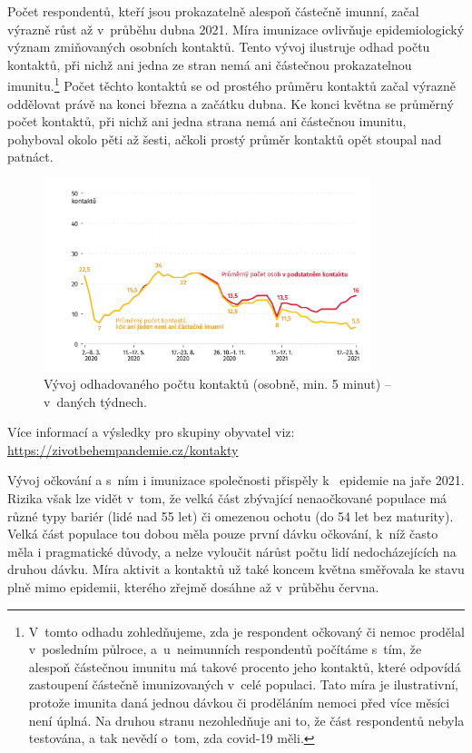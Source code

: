 Počet respondentů, kteří jsou prokazatelně alespoň částečně imunní, začal výrazně růst až v průběhu dubna 2021. Míra imunizace ovlivňuje epidemiologický význam zmiňovaných osobních kontaktů. Tento vývoj ilustruje odhad počtu kontaktů, při nichž ani jedna ze stran nemá ani částečnou prokazatelnou imunitu.\footnote{V tomto odhadu zohledňujeme, zda je respondent očkovaný či nemoc prodělal v~posledním půlroce, a u neimunních respondentů počítáme s tím, že alespoň částečnou imunitu má takové procento jeho kontaktů, které odpovídá zastoupení částečně imunizovaných v celé populaci. Tato míra je ilustrativní, protože imunita daná jednou dávkou či proděláním nemoci před více měsíci není úplná. Na druhou stranu nezohledňuje ani to, že část respondentů nebyla testována, a tak nevědí o~tom, zda covid-19 měli.} Počet těchto kontaktů se od prostého průměru kontaktů začal výrazně oddělovat právě na konci března a začátku dubna. Ke konci května se průměrný počet kontaktů, při nichž ani jedna strana nemá ani částečnou imunitu, pohyboval okolo pěti až šesti, ačkoli prostý průměr kontaktů opět stoupal nad patnáct.

\begin{figure}[ht]
    \centering
    \includegraphics[width=0.85\textwidth]{./pic/zbp-graf7.png}
    \caption{Vývoj odhadovaného počtu kontaktů (osobně, min. 5 minut) – v daných týdnech.}
    \label{fig:zbp7}
\end{figure}

Více informací a výsledky pro skupiny obyvatel viz: \url{https://zivotbehempandemie.cz/kontakty}

Vývoj očkování a s ním i imunizace společnosti přispěly k~ epidemie na jaře 2021. Rizika však lze vidět v tom, že velká část zbývající nenaočkované populace má různé typy bariér (lidé nad 55 let) či omezenou ochotu (do 54 let bez maturity). Velká část populace tou dobou měla pouze první dávku očkování, k níž často měla i pragmatické důvody, a nelze vyloučit nárůst počtu lidí nedocházejících na druhou dávku. Míra aktivit a kontaktů už také koncem května směřovala ke stavu plně mimo epidemii, kterého zřejmě dosáhne až v průběhu června.

